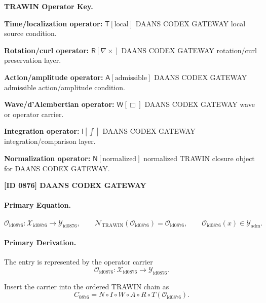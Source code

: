 \par\vspace{0.45\baselineskip}
\noindent\begin{minipage}[t]{\linewidth}
\begingroup
\small
\raggedright
\textbf{TRAWIN Operator Key.}\par
\noindent\textbf{Time/localization operator:} $\mathsf{T}\!\left[\mathrm{local}\right]$ DAANS CODEX GATEWAY local source condition.\par
\noindent\textbf{Rotation/curl operator:} $\mathsf{R}\!\left[\nabla\times\right]$ DAANS CODEX GATEWAY rotation/curl preservation layer.\par
\noindent\textbf{Action/amplitude operator:} $\mathsf{A}\!\left[\mathrm{admissible}\right]$ DAANS CODEX GATEWAY admissible action/amplitude condition.\par
\noindent\textbf{Wave/d'Alembertian operator:} $\mathsf{W}\!\left[\Box\right]$ DAANS CODEX GATEWAY wave or operator carrier.\par
\noindent\textbf{Integration operator:} $\mathsf{I}\!\left[\int\right]$ DAANS CODEX GATEWAY integration/comparison layer.\par
\noindent\textbf{Normalization operator:} $\mathsf{N}\!\left[\mathrm{normalized}\right]$ normalized TRAWIN closure object for DAANS CODEX GATEWAY.\par
\endgroup
\end{minipage}

\clearpage
\noindent\textbf{[ID 0876] DAANS CODEX GATEWAY}\par
\vspace{0.35em}
\paragraph{Primary Equation.}
\[
\mathcal{O}_{\mathrm{id0876}}:\mathcal{X}_{\mathrm{id0876}}\longrightarrow \mathcal{Y}_{\mathrm{id0876}},\qquad
\mathcal{N}_{\mathrm{TRAWIN}}(\mathcal{O}_{\mathrm{id0876}})=\mathcal{O}_{\mathrm{id0876}},\qquad
\mathcal{O}_{\mathrm{id0876}}(x)\in\mathcal{Y}_{\mathrm{adm}}.
\]

\paragraph{Primary Derivation.} The entry is represented by the operator carrier\[
\mathcal{O}_{\mathrm{id0876}}:\mathcal{X}_{\mathrm{id0876}}\longrightarrow \mathcal{Y}_{\mathrm{id0876}}.
\]

Insert the carrier into the ordered TRAWIN chain as\[
C_{0876}=N\circ I\circ W\circ A\circ R\circ T(\mathcal{O}_{\mathrm{id0876}}).
\]

